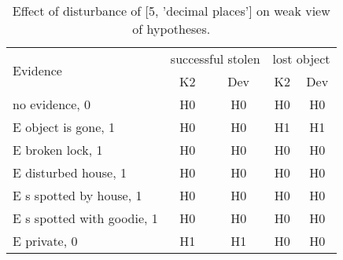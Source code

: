 \begin{table}\begin{tabular}{l|cc|cc}\toprule\multirow{2}{*}{Evidence} & \multicolumn{2}{c}{successful stolen}& \multicolumn{2}{c}{lost object}\\& {K2} & {Dev}& {K2} & {Dev}\\\midrule
no evidence, 0 & H0&H0&H0&H0\\E object is gone, 1 & H0&H0&H1&H1\\E broken lock, 1 & H0&H0&H0&H0\\E disturbed house, 1 & H0&H0&H0&H0\\E s spotted by house, 1 & H0&H0&H0&H0\\E s spotted with goodie, 1 & H0&H0&H0&H0\\E private, 0 & H1&H1&H0&H0\\\bottomrule\end{tabular}\caption{Effect of disturbance of [5, 'decimal places'] on weak view of hypotheses.}\end{table}